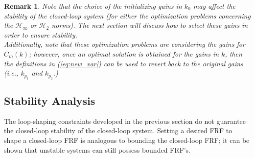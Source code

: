\documentclass[a4paper, 10pt, conference]{ieeeconf}
\newtheorem*{remark}{Remark}
\begin{document}

\begin{remark}
\textit{Note that the choice of the initializing gains in $k_0$ may affect the stability of the closed-loop system (for either the optimization problems concerning the $\mathcal{H}_\infty$ or $\mathcal{H}_2$ norms). The next section will discuss how to select these gains in order to ensure stability. \\ 
Additionally, note that these optimization problems are considering the gains for $C_m(k)$; however, once an optimal solution is obtained for the gains in $k$, then the definitions in (\ref{eq:new_var}) can be used to revert back to the original gains (i.e., $k_{p_1}$ and $k_{p_2}$.)}
\end{remark}

\subsection{Stability Analysis}
The loop-shaping constraints developed in the previous section do not guarantee the closed-loop stability of the closed-loop system. Setting a desired FRF to shape a closed-loop FRF is analogous to bounding the closed-loop FRF; it can be shown that unstable systems can still possess bounded FRF's. 
\end{document}
